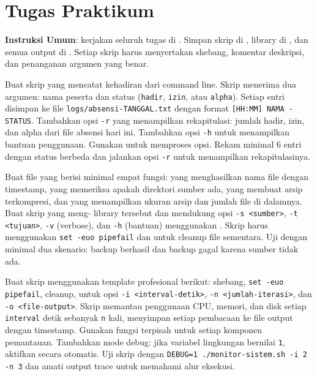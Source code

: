 \section{Tugas Praktikum}
\label{sec:tugas-praktikum-bash-prog}

\textbf{Instruksi Umum}: kerjakan seluruh tugas di
. Simpan skrip di , library
di , dan semua output di . Setiap skrip harus
menyertakan shebang, komentar deskripsi, dan penanganan argumen yang
benar.

\begin{exercisebox}
Buat skrip  yang mencatat kehadiran dari command line.
Skrip menerima dua argumen: nama peserta dan status (\texttt{hadir},
\texttt{izin}, atau \texttt{alpha}). Setiap entri disimpan ke file
\texttt{logs/absensi-TANGGAL.txt} dengan format
\texttt{[HH:MM] NAMA - STATUS}. Tambahkan opsi \texttt{-r} yang
menampilkan rekapitulasi: jumlah hadir, izin, dan alpha dari file absensi
hari ini. Tambahkan opsi \texttt{-h} untuk menampilkan bantuan penggunaan.
Gunakan  untuk memproses opsi. Rekam minimal 6 entri dengan
status berbeda dan jalankan opsi \texttt{-r} untuk menampilkan
rekapitulasinya.
\end{exercisebox}

\begin{exercisebox}
Buat file  yang berisi minimal empat fungsi:
 yang menghasilkan nama file dengan timestamp,
 yang memeriksa apakah direktori sumber ada,
 yang membuat arsip terkompresi, dan
 yang menampilkan ukuran arsip dan jumlah file
di dalamnya. Buat skrip  yang meng-
library tersebut dan mendukung opsi \texttt{-s <sumber>}, \texttt{-t
<tujuan>}, \texttt{-v} (verbose), dan \texttt{-h} (bantuan) menggunakan
. Skrip harus menggunakan \texttt{set -euo pipefail} dan
 untuk cleanup file sementara. Uji dengan minimal dua skenario:
backup berhasil dan backup gagal karena sumber tidak ada.
\end{exercisebox}

\begin{exercisebox}
Buat skrip  menggunakan template profesional
berikut: shebang, \texttt{set -euo pipefail},  cleanup,
 untuk opsi \texttt{-i <interval-detik>}, \texttt{-n
<jumlah-iterasi>}, dan \texttt{-o <file-output>}. Skrip memantau
penggunaan CPU, memori, dan disk setiap \texttt{interval} detik sebanyak
\texttt{n} kali, menyimpan setiap pembacaan ke file output dengan
timestamp. Gunakan fungsi terpisah untuk setiap komponen pemantauan.
Tambahkan mode debug: jika variabel lingkungan  bernilai
\texttt{1}, aktifkan  secara otomatis. Uji skrip dengan
\texttt{DEBUG=1 ./monitor-sistem.sh -i 2 -n 3} dan amati output trace
untuk memahami alur eksekusi.
\end{exercisebox}


